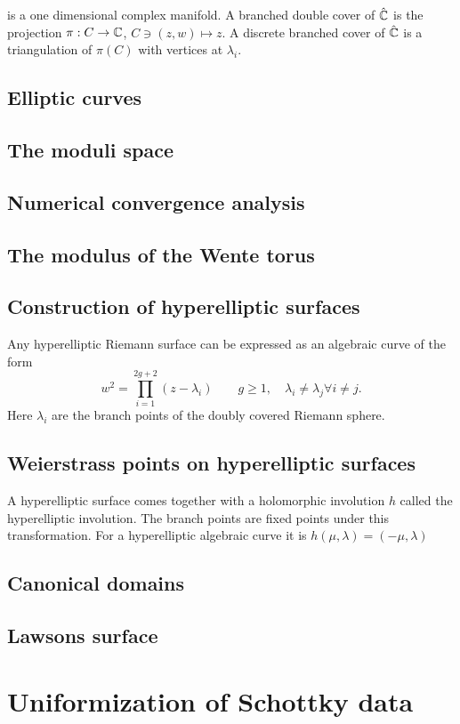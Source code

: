 is a one dimensional complex manifold. A branched double cover of $\hat{\mathbb C}$ is the projection $\pi:C\to\mathbb C$, $C\ni(z,w)\mapsto z$. A discrete branched cover of $\hat{\mathbb C}$ is a triangulation of $\pi(C)$ with vertices at $\lambda_i$.

\subsection{Elliptic curves}
\subsection{The moduli space}
\subsection{Numerical convergence analysis}
\subsection{The modulus of the Wente torus}

\subsection{Construction of hyperelliptic surfaces}
Any hyperelliptic Riemann surface can be expressed as an algebraic curve of the form
\[ w^2 = \prod_{i=1}^{2g+2}(z-\lambda_i) \quad\quad g\geq1,\quad \lambda_i\neq \lambda_j \forall i\neq j.\]
Here $\lambda_i$ are the branch points of the doubly covered Riemann sphere.

\subsection{Weierstrass points on hyperelliptic surfaces}
A hyperelliptic surface comes together with a holomorphic involution $h$ called the hyperelliptic involution. The branch points are fixed points under this transformation. For a hyperelliptic algebraic curve it is $h(\mu, \lambda)=(-\mu, \lambda)$

\subsection{Canonical domains}
\subsection{Lawsons surface}

\section{Uniformization of Schottky data}
